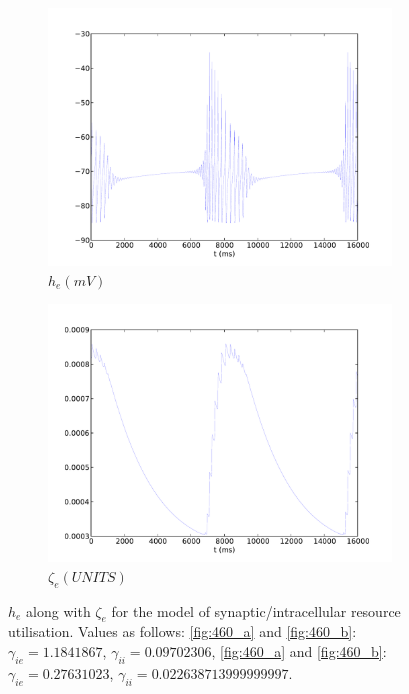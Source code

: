 \documentclass[a4paper,12pt]{article}
\begin{document}
\begin{figure}
\begin{subfigure}[b]{0.5\textwidth}
		\includegraphics[scale=0.35]{chosen-frontiers-2012/00460-0_7-he-intra.pdf}
		\caption{$h_e (mV)$}
	\end{subfigure}
	\begin{subfigure}[b]{0.5\textwidth}
		\includegraphics[scale=0.35]{chosen-frontiers-2012/00460-0_7-slow-intra.pdf}
		\caption{$\zeta_e (UNITS)$}
	\end{subfigure}
      \label{fig:emerging_slow_zeta}
	\caption{$h_e$ along with $\zeta_e$ for the model of synaptic/intracellular resource utilisation. 
	Values as follows:
	\ref{fig:460_a} and \ref{fig:460_b}: $\gamma_{ie}=1.1841867$, $\gamma_{ii}=0.09702306$, \ref{fig:460_a} and \ref{fig:460_b}:  $\gamma_{ie}=0.27631023$, $\gamma_{ii}=0.022638713999999997$. 
}
\end{figure}
\end{document}
